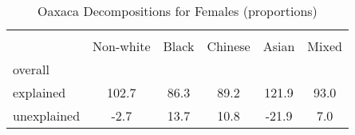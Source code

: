 \begin{table}[htbp]\centering
\caption{Oaxaca Decompositions for Females (proportions)}
\begin{tabular}{l*{5}{c}}
\hline\hline
          &         &         &         &         &         \\
          &Non-white&    Black&  Chinese&    Asian&    Mixed\\
\hline
overall   &         &         &         &         &         \\
explained &    102.7&     86.3&     89.2&    121.9&     93.0\\
unexplained&     -2.7&     13.7&     10.8&    -21.9&      7.0\\
\hline\hline
\end{tabular}
\label{tab:oaxaca_pct_female}
\end{table}
